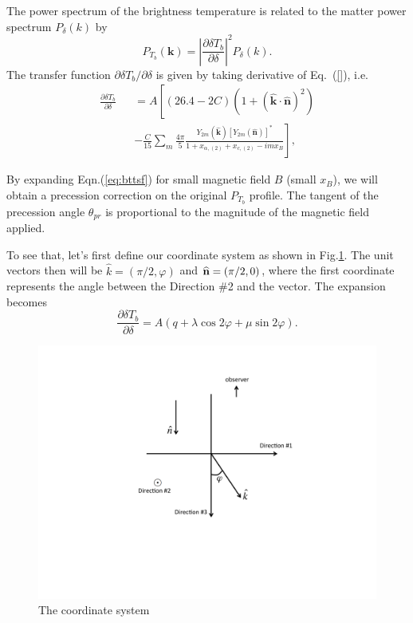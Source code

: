 The power spectrum of the brightness temperature is related to the matter power spectrum $P_\delta(k)$ by
\begin{equation}
P_{T_b}(\bm k)=\left\vert\frac{\partial\delta T_b}{\partial\delta}\right\vert^2 P_\delta(k).
\end{equation}
The transfer function $\partial\delta T_b/\partial\delta$ is given by taking derivative of Eq.~(\ref{}), i.e.~\begin{eqnarray}
\frac{\partial\delta T_b}{\partial\delta}&&=A\left[(26.4-2C)\left(1 + (\hat{\bm k} \cdot \hat{\bm n})^2\right)\right. \nonumber\\
&&\left.-\frac{C}{15}\sum_m \frac{4\pi}{5}\frac{Y_{2m}(\hat{\bm k})[Y_{2m}(\hat{\bm n})]^*}{1+x_{\alpha,(2)}+x_{c,(2)}-imx_B}\right],
\label{eq:bttsf}
\end{eqnarray}

By expanding Eqn.(\ref{eq:bttsf}) for small magnetic field $B$ (small $x_B$), we will obtain a precession correction on the original $P_{T_b}$ profile. The tangent of the precession angle $\theta_{pr}$ is proportional to the magnitude of the magnetic field applied.

To see that, let's first define our coordinate system as shown in Fig.\ref{fig:coordinate}. The unit vectors then will be $\hat{k}=(\pi/2,\varphi)$ and ${\bf{\widehat n}}=(\pi/2,0)$, where the first coordinate represents the angle between the Direction \#2 and the vector. The expansion becomes
\begin{equation}
\frac{\partial\delta T_b}{\partial\delta}=A(q+\lambda\cos 2\varphi+\mu\sin 2\varphi).
\label{eq:Tbtsf_simplified}
\end{equation}
\begin{figure}
\centering
\includegraphics[scale=0.3]{coordinate.pdf}
\caption{The coordinate system}
\label{fig:coordinate}
\end{figure}

